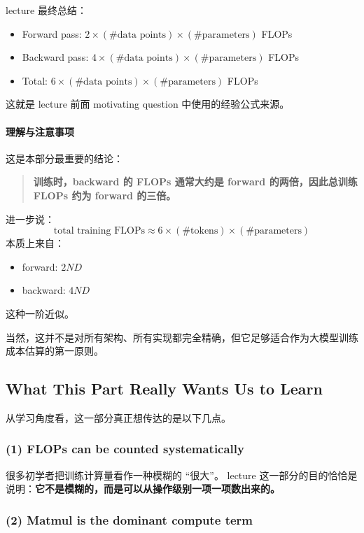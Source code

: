 \documentclass[a4paper,UTF8]{article}
\numberwithin{equation}{section}
\begin{document}
lecture 最终总结：
\begin{itemize}
    \item Forward pass: \(2 \times (\#\text{data points}) \times (\#\text{parameters})\) FLOPs
    \item Backward pass: \(4 \times (\#\text{data points}) \times (\#\text{parameters})\) FLOPs
    \item Total: \(6 \times (\#\text{data points}) \times (\#\text{parameters})\) FLOPs
\end{itemize}

这就是 lecture 前面 motivating question 中使用的经验公式来源。

\paragraph{理解与注意事项}
这是本部分最重要的结论：

\begin{quote}
\textbf{训练时，backward 的 FLOPs 通常大约是 forward 的两倍，因此总训练 FLOPs 约为 forward 的三倍。}
\end{quote}

进一步说：
\[
\text{total training FLOPs}
\approx
6 \times (\#\text{tokens}) \times (\#\text{parameters})
\]
本质上来自：
\begin{itemize}
    \item forward: \(2ND\)
    \item backward: \(4ND\)
\end{itemize}
这种一阶近似。

当然，这并不是对所有架构、所有实现都完全精确，但它足够适合作为大模型训练成本估算的第一原则。

\subsection{What This Part Really Wants Us to Learn}

从学习角度看，这一部分真正想传达的是以下几点。

\subsubsection{(1) FLOPs can be counted systematically}

很多初学者把训练计算量看作一种模糊的 ``很大''。  
lecture 这一部分的目的恰恰是说明：\textbf{它不是模糊的，而是可以从操作级别一项一项数出来的。}

\subsubsection{(2) Matmul is the dominant compute term}
\end{document}
